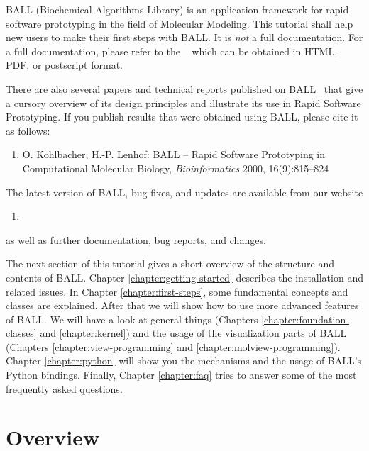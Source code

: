 BALL (Biochemical Algorithms Library) is an application framework for rapid
software prototyping in the field of Molecular Modeling.  This tutorial shall
help new users to make their first steps with BALL. It is {\em not} a full
documentation. For a full documentation, please refer to the ~\cite{BALL-RM} which can be obtained in HTML, PDF, or postscript format.

There are also several papers and technical reports published on
BALL~\cite{BKL2000,BKL99a,BKL99b,KL99,Koh2001} that give a cursory overview 
of its design principles and illustrate its use in Rapid Software Prototyping. If you
publish results that were obtained using BALL, please cite it as follows:
\begin{enumerate}
	\item[] O. Kohlbacher, H.-P. Lenhof: BALL -- Rapid Software Prototyping
  in Computational Molecular Biology, {\em Bioinformatics} 2000,
	16(9):815--824
\end{enumerate}

\noindent
The latest version of BALL, bug fixes, and updates are available from our website

\begin{enumerate}
  \item[] 
\end{enumerate}

\noindent 
as well as further documentation, bug reports, and changes.

The next section of this tutorial gives a short overview of the structure and
contents of BALL. Chapter \ref{chapter:getting-started} describes the
installation and related issues. In Chapter \ref{chapter:first-steps}, some
fundamental concepts and classes are explained. After that we will show how to
use more advanced features of BALL. We will have a look at general things
(Chapters \ref{chapter:foundation-classes} and  \ref{chapter:kernel}) 
and the usage of the visualization parts of BALL (Chapters \ref{chapter:view-programming} and
\ref{chapter:molview-programming}). Chapter \ref{chapter:python} will show you
the mechanisms and the usage of BALL's Python bindings.  Finally, Chapter
\ref{chapter:faq} tries to answer some of the most frequently asked questions.

\section{Overview}


